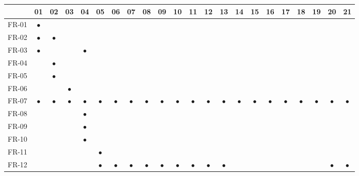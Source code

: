 \documentclass[11pt,a4paper]{article}
\begin{document}
\begin{longtable}{@{}l*{21}{c}@{}}
\toprule
\rowcolor{hdr}&01&02&03&04&05&06&07&08&09&10&11&12&13&14&15&16&17&18&19&20&21\\
\midrule
\endhead
FR-01&\cellcolor{hdr}\textcolor{creBlue}{$\bullet$}&&&&&&&&&&&&&&&&&&&&\\
FR-02&\cellcolor{hdr}\textcolor{creBlue}{$\bullet$}&\cellcolor{hdr}\textcolor{creBlue}{$\bullet$}&&&&&&&&&&&&&&&&&&&\\
FR-03&\cellcolor{hdr}\textcolor{creBlue}{$\bullet$}&&&\cellcolor{hdr}\textcolor{creBlue}{$\bullet$}&&&&&&&&&&&&&&&&&\\
FR-04&&\cellcolor{hdr}\textcolor{creBlue}{$\bullet$}&&&&&&&&&&&&&&&&&&&\\
FR-05&&\cellcolor{hdr}\textcolor{creBlue}{$\bullet$}&&&&&&&&&&&&&&&&&&&\\
FR-06&&&\cellcolor{hdr}\textcolor{creBlue}{$\bullet$}&&&&&&&&&&&&&&&&&&\\
FR-07&\cellcolor{hdr}\textcolor{creBlue}{$\bullet$}&\cellcolor{hdr}\textcolor{creBlue}{$\bullet$}&\cellcolor{hdr}\textcolor{creBlue}{$\bullet$}&\cellcolor{hdr}\textcolor{creBlue}{$\bullet$}&\cellcolor{hdr}\textcolor{creBlue}{$\bullet$}&\cellcolor{hdr}\textcolor{creBlue}{$\bullet$}&\cellcolor{hdr}\textcolor{creBlue}{$\bullet$}&\cellcolor{hdr}\textcolor{creBlue}{$\bullet$}&\cellcolor{hdr}\textcolor{creBlue}{$\bullet$}&\cellcolor{hdr}\textcolor{creBlue}{$\bullet$}&\cellcolor{hdr}\textcolor{creBlue}{$\bullet$}&\cellcolor{hdr}\textcolor{creBlue}{$\bullet$}&\cellcolor{hdr}\textcolor{creBlue}{$\bullet$}&\cellcolor{hdr}\textcolor{creBlue}{$\bullet$}&\cellcolor{hdr}\textcolor{creBlue}{$\bullet$}&\cellcolor{hdr}\textcolor{creBlue}{$\bullet$}&\cellcolor{hdr}\textcolor{creBlue}{$\bullet$}&\cellcolor{hdr}\textcolor{creBlue}{$\bullet$}&\cellcolor{hdr}\textcolor{creBlue}{$\bullet$}&\cellcolor{hdr}\textcolor{creBlue}{$\bullet$}&\cellcolor{hdr}\textcolor{creBlue}{$\bullet$}\\
FR-08&&&&\cellcolor{hdr}\textcolor{creBlue}{$\bullet$}&&&&&&&&&&&&&&&&&\\
FR-09&&&&\cellcolor{hdr}\textcolor{creBlue}{$\bullet$}&&&&&&&&&&&&&&&&&\\
FR-10&&&&\cellcolor{hdr}\textcolor{creBlue}{$\bullet$}&&&&&&&&&&&&&&&&&\\
FR-11&&&&&\cellcolor{hdr}\textcolor{creBlue}{$\bullet$}&&&&&&&&&&&&&&&&\\
FR-12&&&&&\cellcolor{hdr}\textcolor{creBlue}{$\bullet$}&\cellcolor{hdr}\textcolor{creBlue}{$\bullet$}&\cellcolor{hdr}\textcolor{creBlue}{$\bullet$}&\cellcolor{hdr}\textcolor{creBlue}{$\bullet$}&\cellcolor{hdr}\textcolor{creBlue}{$\bullet$}&\cellcolor{hdr}\textcolor{creBlue}{$\bullet$}&\cellcolor{hdr}\textcolor{creBlue}{$\bullet$}&\cellcolor{hdr}\textcolor{creBlue}{$\bullet$}&\cellcolor{hdr}\textcolor{creBlue}{$\bullet$}&&&&&&&\cellcolor{hdr}\textcolor{creBlue}{$\bullet$}&\cellcolor{hdr}\textcolor{creBlue}{$\bullet$}\\

\end{longtable}
\end{document}
